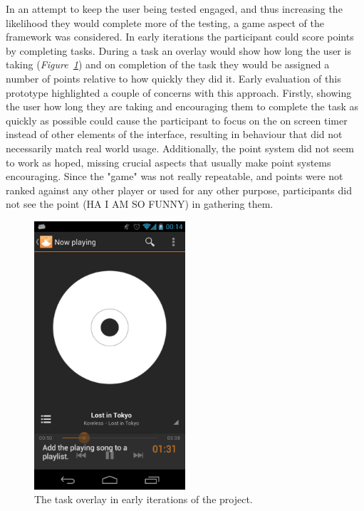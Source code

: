 In an attempt to keep the user being tested engaged, and thus increasing the likelihood they would complete more of the testing, a game aspect of the framework was considered. In early
iterations the participant could score points by completing tasks. During a task an overlay would show how long the user is taking (\emph{Figure~\ref{fig:initial-overlay}}) and on completion of the task
they would be assigned a number of points relative to how quickly they did it.
Early evaluation of this prototype highlighted a couple of concerns with this approach. Firstly, showing the user how
long they are taking and encouraging them to complete the task as quickly as
possible could cause the participant to focus on the on screen timer instead of other elements of the interface, resulting in behaviour that did not necessarily match real world usage.
Additionally, the point system did not seem to work as hoped, missing crucial aspects that usually make point systems encouraging.  Since the "game" was not really repeatable, and points were not ranked against any other player or used for any other purpose, participants did not see the point (HA I AM SO FUNNY) in gathering them. 

\begin{figure}[ht!]
  \centering 
  \includegraphics[width=0.5\textwidth]{images/time-taken}
  \caption{The task overlay in early iterations of the project.}
  \label{fig:initial-overlay}
\end{figure}

